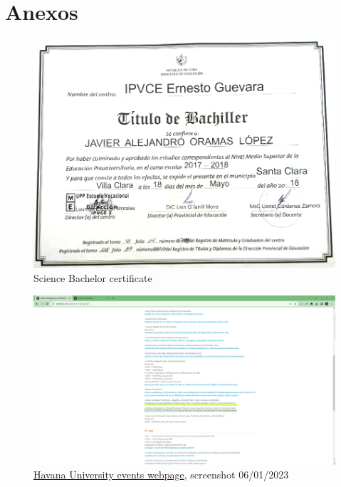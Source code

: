 \documentclass{article}
\begin{document}
\newpage
\section*{Anexos}
\begin{figure}[h]
    \includegraphics[width=\textwidth]{images/bachelor.png}
    \caption{Science Bachelor certificate}
    \label{sec:bachelor}
\end{figure}

\begin{figure}[h]
    \includegraphics[width=\textwidth]{images/ai_workshop.png}
    \caption{\href{https://eventos.uh.cu/event/7/program}{Havana University events webpage}, screenshot 06/01/2023}
    \label{sec:workshop}
\end{figure}
\end{document}
